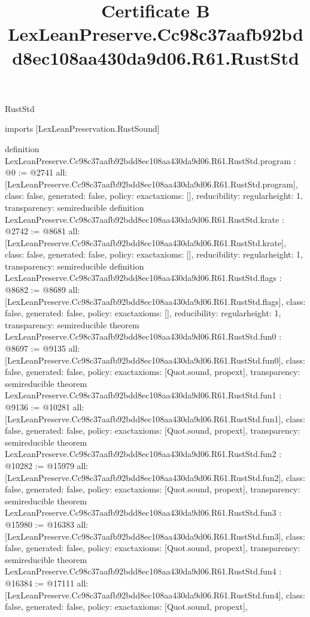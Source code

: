 \begin{lexlean}{RustStd}
\title{Certificate B LexLeanPreserve.Cc98c37aafb92bdd8ec108aa430da9d06.R61.RustStd}
\begin{coremodule}
imports [LexLeanPreservation.RustSound]

definition LexLeanPreserve.Cc98c37aafb92bdd8ec108aa430da9d06.R61.RustStd.program : @0 := @2741 {
  all: [LexLeanPreserve.Cc98c37aafb92bdd8ec108aa430da9d06.R61.RustStd.program],
  class: false,
  generated: false,
  policy: exact{axioms: []},
  reducibility: regular{height: 1},
  transparency: semireducible
}
definition LexLeanPreserve.Cc98c37aafb92bdd8ec108aa430da9d06.R61.RustStd.krate : @2742 := @8681 {
  all: [LexLeanPreserve.Cc98c37aafb92bdd8ec108aa430da9d06.R61.RustStd.krate],
  class: false,
  generated: false,
  policy: exact{axioms: []},
  reducibility: regular{height: 1},
  transparency: semireducible
}
definition LexLeanPreserve.Cc98c37aafb92bdd8ec108aa430da9d06.R61.RustStd.flags : @8682 := @8689 {
  all: [LexLeanPreserve.Cc98c37aafb92bdd8ec108aa430da9d06.R61.RustStd.flags],
  class: false,
  generated: false,
  policy: exact{axioms: []},
  reducibility: regular{height: 1},
  transparency: semireducible
}
theorem LexLeanPreserve.Cc98c37aafb92bdd8ec108aa430da9d06.R61.RustStd.fun0 : @8697 := @9135 {
  all: [LexLeanPreserve.Cc98c37aafb92bdd8ec108aa430da9d06.R61.RustStd.fun0],
  class: false,
  generated: false,
  policy: exact{axioms: [Quot.sound, propext]},
  transparency: semireducible
}
theorem LexLeanPreserve.Cc98c37aafb92bdd8ec108aa430da9d06.R61.RustStd.fun1 : @9136 := @10281 {
  all: [LexLeanPreserve.Cc98c37aafb92bdd8ec108aa430da9d06.R61.RustStd.fun1],
  class: false,
  generated: false,
  policy: exact{axioms: [Quot.sound, propext]},
  transparency: semireducible
}
theorem LexLeanPreserve.Cc98c37aafb92bdd8ec108aa430da9d06.R61.RustStd.fun2 : @10282 := @15979 {
  all: [LexLeanPreserve.Cc98c37aafb92bdd8ec108aa430da9d06.R61.RustStd.fun2],
  class: false,
  generated: false,
  policy: exact{axioms: [Quot.sound, propext]},
  transparency: semireducible
}
theorem LexLeanPreserve.Cc98c37aafb92bdd8ec108aa430da9d06.R61.RustStd.fun3 : @15980 := @16383 {
  all: [LexLeanPreserve.Cc98c37aafb92bdd8ec108aa430da9d06.R61.RustStd.fun3],
  class: false,
  generated: false,
  policy: exact{axioms: [Quot.sound, propext]},
  transparency: semireducible
}
theorem LexLeanPreserve.Cc98c37aafb92bdd8ec108aa430da9d06.R61.RustStd.fun4 : @16384 := @17111 {
  all: [LexLeanPreserve.Cc98c37aafb92bdd8ec108aa430da9d06.R61.RustStd.fun4],
  class: false,
  generated: false,
  policy: exact{axioms: [Quot.sound, propext]},
}
\end{coremodule}
\end{lexlean}
